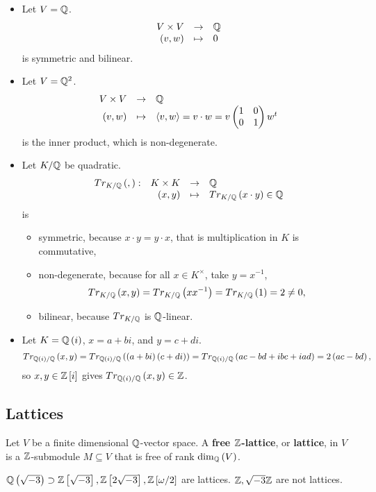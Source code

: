 \begin{example*}
\hfill
\begin{itemize}
\item Let $ V = \mathbb{Q} $.
$$ \function{V \times V}{\Q}{\rb{v, w}}{0} $$
is symmetric and bilinear.
\item Let $ V = \mathbb{Q}^2 $.
$$ \function{V \times V}{\Q}{\rb{v, w}}{\ab{v, w} = v \cdot w = v\twobytwo{1}{0}{0}{1}w^t} $$
is the inner product, which is non-degenerate.
\item Let $ K / \mathbb{Q} $ be quadratic.
$$ \function[Tr_{K / \Q}\rb{,}]{K \times K}{\Q}{\rb{x, y}}{Tr_{K / \Q}\rb{x \cdot y} \in \Q} $$
is
\begin{itemize}
\item symmetric, because $ x \cdot y = y \cdot x $, that is multiplication in $ K $ is commutative,
\item non-degenerate, because for all $ x \in K^\times $, take $ y = x^{-1} $,
$$ Tr_{K / \mathbb{Q}}\left( x, y \right) = Tr_{K / \mathbb{Q}}\left( xx^{-1} \right) = Tr_{K / \mathbb{Q}}\left( 1 \right) = 2 \ne 0, $$
\item bilinear, because $ Tr_{K / \mathbb{Q}} $ is $ \mathbb{Q} $-linear.
\end{itemize}
\item Let $ K = \mathbb{Q}\left( i \right) $, $ x = a + bi $, and $ y = c + di $.
$$ Tr_{\mathbb{Q}\left( i \right) / \mathbb{Q}}\left( x, y \right) = Tr_{\mathbb{Q}\left( i \right) / \mathbb{Q}}\left( \left( a + bi \right)\left( c + di \right) \right) = Tr_{\mathbb{Q}\left( i \right) / \mathbb{Q}}\left( ac - bd + ibc + iad \right) = 2\left( ac - bd \right), $$
so $ x, y \in \mathbb{Z}\left[ i \right] $ gives $ Tr_{\mathbb{Q}\left( i \right) / \mathbb{Q}}\left( x, y \right) \in \mathbb{Z} $.
\end{itemize}
\end{example*}

\pagebreak

\subsection{Lattices}


\begin{definition}
Let $ V $ be a finite dimensional $ \mathbb{Q} $-vector space. A \textbf{free $ \mathbb{Z} $-lattice}, or \textbf{lattice}, in $ V $ is a $ \mathbb{Z} $-submodule $ M \subseteq V $ that is free of rank $ \dim_{\mathbb{Q}}\left( V \right) $.
\end{definition}

\begin{example*}
$ \mathbb{Q}\left( \sqrt{-3} \right) \supset \mathbb{Z}\left[ \sqrt{-3} \right], \mathbb{Z}\left[ 2\sqrt{-3} \right], \mathbb{Z}\left[ \omega / 2 \right] $ are lattices. $ \mathbb{Z}, \sqrt{-3}\mathbb{Z} $ are not lattices.
\end{example*}


